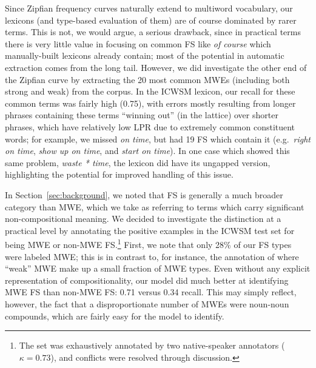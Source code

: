 \documentclass[11pt,letterpaper]{article}
\newcommand{\ex}[1]{\textit{#1}\xspace}
\newcommand{\secref}[2][]{Section#1~\ref{#2}\xspace}
\begin{document}
Since Zipfian frequency curves naturally extend to multiword vocabulary, our lexicons (and type-based evaluation of them) are of course dominated by rarer terms. This is not, we would argue, a serious drawback, since in practical terms there is very little value in focusing on common FS like \ex{of course} which manually-built lexicons already contain; most of the potential in automatic extraction comes from the long tail. However, we did investigate the other end of the Zipfian curve by extracting the 20 most common MWEs (including both strong and weak) from the  corpus. In the ICWSM lexicon, our recall for these common terms was fairly high (0.75), with errors mostly resulting from longer phrases containing these terms ``winning out'' (in the lattice) over shorter phrases, which have relatively low LPR due to extremely common constituent words; for example, we missed \ex{on time}, but had 19 FS which contain it (e.g.\ \ex{right on time}, \ex{show up on time}, and \ex{start on time}). In one case which showed this same problem, \ex{waste * time}, the lexicon did have its ungapped version, highlighting the potential for improved handling of this issue. 



In \secref{sec:background}, we noted that FS is generally a much broader category than MWE, which we take as referring to terms which carry significant non-compositional meaning. We decided to investigate the distinction at a practical level by annotating the positive examples in the ICWSM test set for being MWE or non-MWE FS.\footnote{The set was exhaustively annotated by two native-speaker annotators ($\kappa = 0.73$), and conflicts were resolved through discussion.} First, we note that only 28\% of our FS types were labeled MWE; this is in contrast to, for instance, the annotation of  where ``weak'' MWE make up a small fraction of MWE types. Even without any explicit representation of compositionality, our model did much better at identifying MWE FS than non-MWE FS:  0.71 versus 0.34 recall. This may simply reflect, however, the fact that a disproportionate number of MWEs were noun-noun compounds, which are fairly easy for the model to identify.
\end{document}
